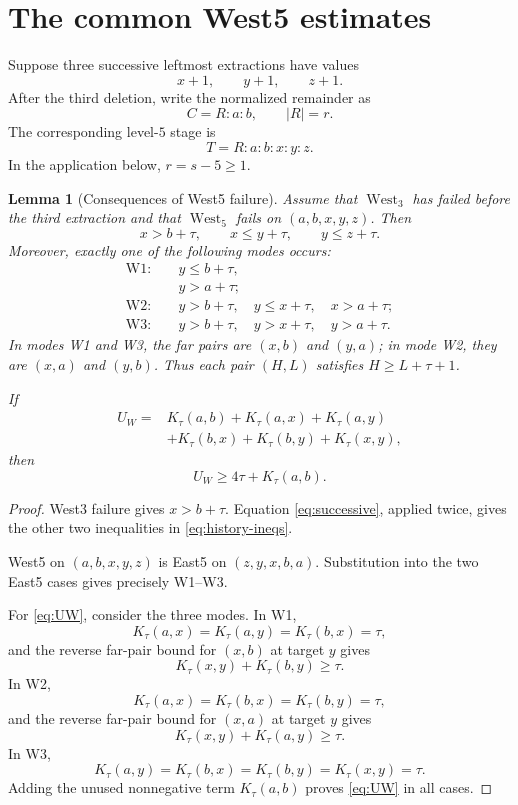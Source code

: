 \documentclass[11pt]{article}
\newtheorem{lemma}[theorem]{Lemma}
\theoremstyle{definition}
\theoremstyle{remark}
\newcommand{\West}{\operatorname{West}}
\begin{document}
\section{The common West5 estimates}

Suppose three successive leftmost extractions have values
\[
 x+1,\qquad y+1,\qquad z+1.
\]
After the third deletion, write the normalized remainder as
\[
 C=R:a:b,
 \qquad |R|=r.
\]
The corresponding level-$5$ stage is
\begin{equation}
 T=R:a:b:x:y:z.
 \label{eq:T-stage}
\end{equation}
In the application below, $r=s-5\ge1$.

\begin{lemma}[Consequences of West5 failure]
\label{lem:west-consequences}
Assume that $\West_3$ has failed before the third extraction and that
$\West_5$ fails on $(a,b,x,y,z)$.  Then
\begin{equation}
 x>b+\tau,
 \qquad x\le y+\tau,
 \qquad y\le z+\tau.
 \label{eq:history-ineqs}
\end{equation}
Moreover, exactly one of the following modes occurs:
\begin{align*}
 \mathrm{W1}:&\quad y\le b+\tau,\\[-1mm]
 &\quad y>a+\tau;\\[1mm]
 \mathrm{W2}:&\quad y>b+\tau,
 \quad y\le x+\tau,
 \quad x>a+\tau;\\[1mm]
 \mathrm{W3}:&\quad y>b+\tau,
 \quad y>x+\tau,
 \quad y>a+\tau.
\end{align*}
In modes W1 and W3, the far pairs are $(x,b)$ and $(y,a)$; in mode W2,
they are $(x,a)$ and $(y,b)$.  Thus each pair $(H,L)$ satisfies
$H\ge L+\tau+1$.

If
\[
\begin{aligned}
 U_W={}&K_\tau(a,b)+K_\tau(a,x)+K_\tau(a,y)\\
 &+K_\tau(b,x)+K_\tau(b,y)+K_\tau(x,y),
\end{aligned}
\]
then
\begin{equation}
 U_W\ge4\tau+K_\tau(a,b).
 \label{eq:UW}
\end{equation}
\end{lemma}

\begin{proof}
West3 failure gives $x>b+\tau$.  Equation
\eqref{eq:successive}, applied twice, gives the other two inequalities in
\eqref{eq:history-ineqs}.

West5 on $(a,b,x,y,z)$ is East5 on $(z,y,x,b,a)$.  Substitution into the
two East5 cases gives precisely W1--W3.

For \eqref{eq:UW}, consider the three modes.  In W1,
\[
 K_\tau(a,x)=K_\tau(a,y)=K_\tau(b,x)=\tau,
\]
and the reverse far-pair bound for $(x,b)$ at target $y$ gives
\[
 K_\tau(x,y)+K_\tau(b,y)\ge\tau.
\]
In W2,
\[
 K_\tau(a,x)=K_\tau(b,x)=K_\tau(b,y)=\tau,
\]
and the reverse far-pair bound for $(x,a)$ at target $y$ gives
\[
 K_\tau(x,y)+K_\tau(a,y)\ge\tau.
\]
In W3,
\[
 K_\tau(a,y)=K_\tau(b,x)=K_\tau(b,y)=K_\tau(x,y)=\tau.
\]
Adding the unused nonnegative term $K_\tau(a,b)$ proves
\eqref{eq:UW} in all cases.
\end{proof}
\end{document}
